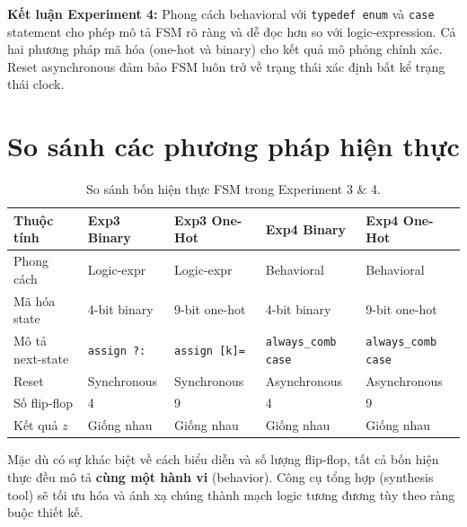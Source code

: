 \documentclass[12pt, a4paper]{article}
\begin{document}
\begin{resultbox}
\textbf{Kết luận Experiment 4:} Phong cách behavioral với \texttt{typedef enum} và \texttt{case} statement cho phép mô tả FSM rõ ràng và dễ đọc hơn so với logic-expression. Cả hai phương pháp mã hóa (one-hot và binary) cho kết quả mô phỏng chính xác. Reset asynchronous đảm bảo FSM luôn trở về trạng thái xác định bất kể trạng thái clock.
\end{resultbox}

\section{So sánh các phương pháp hiện thực}
\label{sec:compare}

\begin{table}[H]
\centering
\caption{So sánh bốn hiện thực FSM trong Experiment 3 \& 4.}
\label{tab:compare}
\begin{tabular}{lllll}
\toprule
\textbf{Thuộc tính} & \textbf{Exp3 Binary} & \textbf{Exp3 One-Hot} & \textbf{Exp4 Binary} & \textbf{Exp4 One-Hot} \\
\midrule
Phong cách       & Logic-expr    & Logic-expr     & Behavioral      & Behavioral \\
Mã hóa state     & 4-bit binary  & 9-bit one-hot  & 4-bit binary    & 9-bit one-hot \\
Mô tả next-state & \texttt{assign ?:} & \texttt{assign [k]=} & \texttt{always\_comb case} & \texttt{always\_comb case} \\
Reset            & Synchronous   & Synchronous    & Asynchronous    & Asynchronous \\
Số flip-flop     & 4             & 9              & 4               & 9 \\
Kết quả $z$      & Giống nhau    & Giống nhau     & Giống nhau      & Giống nhau \\
\bottomrule
\end{tabular}
\end{table}

Mặc dù có sự khác biệt về cách biểu diễn và số lượng flip-flop, tất cả bốn hiện thực đều mô tả \textbf{cùng một hành vi} (behavior). Công cụ tổng hợp (synthesis tool) sẽ tối ưu hóa và ánh xạ chúng thành mạch logic tương đương tùy theo ràng buộc thiết kế.
\end{document}
